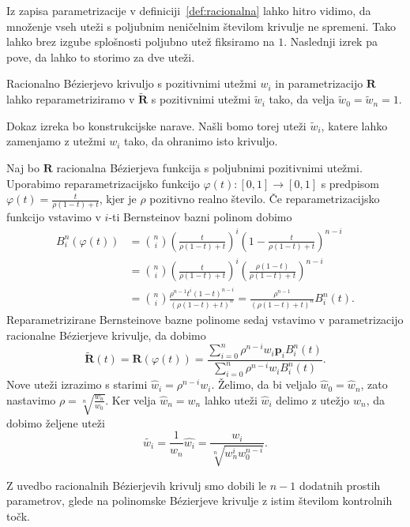 \documentclass[isrm2, tisk]{fmfdelo}
\newcommand{\p}{\mathbf{p}}
\begin{document}
    Iz zapisa parametrizacije v definiciji~\ref{def:racionalna} lahko hitro vidimo, da množenje vseh uteži s poljubnim neničelnim številom krivulje ne spremeni.
    Tako lahko brez izgube splošnosti poljubno utež fiksiramo na $1$.
    Naslednji izrek pa pove, da lahko to storimo za dve uteži.
    \begin{izrek}
        \label{izrek:racionalne-utezi-1}
        Racionalno Bézierjevo krivuljo s pozitivnimi utežmi $w_i$ in parametrizacijo $\mathbf{R}$ lahko reparametriziramo v $\mathbf{\tilde{R}}$ s pozitivnimi utežmi $\tilde{w}_i$ tako, da velja $\tilde{w}_0=\tilde{w}_{n}=1.$
    \end{izrek}
    \noindent Dokaz izreka bo konstrukcijske narave.
    Našli bomo torej uteži $\tilde{w}_i$, katere lahko zamenjamo z utežmi $w_i$ tako, da ohranimo isto krivuljo.
    \begin{dokaz}
        Naj bo $\mathbf{R}$ racionalna Bézierjeva funkcija s poljubnimi pozitivnimi utežmi.
        Uporabimo reparametrizacijsko funkcijo $\varphi(t):[0,1]\to[0,1]$ s predpisom $\varphi(t)=\frac{t}{\rho(1-t)+t}$, kjer je $\rho$ pozitivno realno število.
        Če reparametrizacijsko funkcijo vstavimo v $i$-ti Bernsteinov bazni polinom dobimo
        \begin{align*}
            B^n_i(\varphi(t)) &=  \binom{n}{i}\left(\frac{t}{\rho (1-t)+t}\right)^i\left(1-\frac{t}{\rho (1-t)+t}\right)^{n-i} \\
            &=  \binom{n}{i}\left(\frac{t}{\rho (1-t)+t}\right)^i\left(\frac{\rho(1-t)}{\rho (1-t)+t}\right)^{n-i} \\
            &= \binom{n}{i}\frac{\rho^{n-1}t^{i}(1-t)^{n-i}}{(\rho(1-t)+t)^n} =  \frac{\rho^{n-1}}{(\rho(1-t)+t)^n}B^n_i(t).
        \end{align*}
        Reparametrizirane Bernsteinove bazne polinome sedaj vstavimo v parametrizacijo racionalne Bézierjeve krivulje, da dobimo
        \[\mathbf{\tilde{R}}(t)=\mathbf{R}(\varphi(t)) = \frac{\sum^{n}_{i=0}\rho^{n-i}w_i\p_i B^n_i(t)}{\sum^{n}_{i=0}\rho^{n-i}w_i B^n_i(t)}. \]
        Nove uteži izrazimo s starimi $\hat{w}_i=\rho^{n-i}w_i$.
        Želimo, da bi veljalo $\hat{w}_0=\hat{w}_n$, zato nastavimo $\rho= \sqrt[n]{\frac{w_n}{w_0}}$.
        Ker velja $\hat{w}_n=w_n$ lahko uteži $\hat{w}_i$ delimo z utežjo $w_n$, da dobimo željene uteži \[\tilde{w_i}=\frac{1}{w_n}\hat{w_i} = \frac{w_i}{\sqrt[n]{w^{i}_nw_0^{n-i}}}.\]
    \end{dokaz}
    \begin{posledica}
        Z uvedbo racionalnih Bézierjevih krivulj smo dobili le $n-1$ dodatnih prostih parametrov, glede na polinomske Bézierjeve krivulje z istim številom kontrolnih točk.
    \end{posledica}
\end{document}
